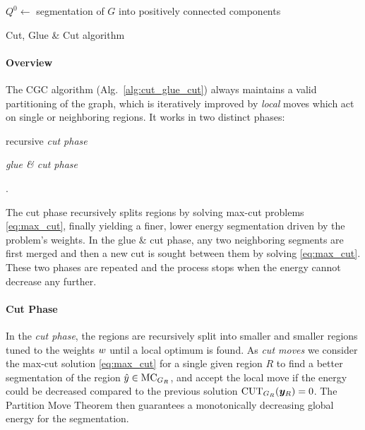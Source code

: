 \begin{algorithm}[t]
\ifx\DontPrintSemicolon\undefined
\else
\DontPrintSemicolon
\fi
{}
%
$Q^0 \leftarrow $ segmentation of $G$ into positively connected components\;
%
\caption{Cut, Glue \& Cut algorithm\label{alg:cut_glue_cut}}
\end{algorithm}

\paragraph{Overview}
The CGC algorithm (Alg.~\ref{alg:cut_glue_cut}) always maintains a valid partitioning of the graph, which
is iteratively improved by \emph{local} moves which
act on single or neighboring regions. It works
in two distinct phases:
\begin{inparaenum}[(i)]%
\item recursive \emph{cut phase} 
\item \emph{glue \& cut phase}%
\end{inparaenum}.

The cut phase recursively splits regions by
solving max-cut problems \eqref{eq:max_cut}, finally yielding a
finer, lower energy segmentation driven by the problem's weights.
In the glue \& cut
phase, any two neighboring segments are first merged and then a new cut is
sought between them by solving \eqref{eq:max_cut}.
These two phases are repeated and the process stops when the
energy cannot decrease any further.

\paragraph{Cut Phase}
In the \emph{cut phase}, the regions
are recursively split 
into smaller and smaller regions tuned to the weights $w$ 
until a local optimum is found.
As \emph{cut moves} 
we consider the max-cut solution \eqref{eq:max_cut}
for a single given region $R$ to
find a better segmentation of the region
$\hat{y}\in\text{MC}_{G_R}$,
and accept the
local move if the energy could be decreased compared
to the previous solution $\text{CUT}_{G_R}(\boldsymbol y_R) = 0$.
%
The Partition Move Theorem then guarantees a
monotonically decreasing global energy for the segmentation.


